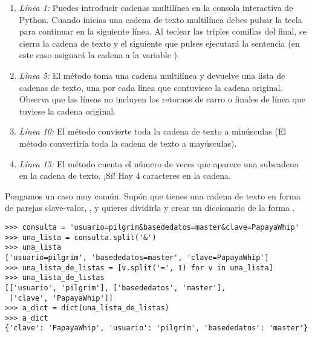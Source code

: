 \begin{enumerate}

\item \emph{Línea 1:} Puedes introducir cadenas multilínea en la consola interactiva de Python. Cuando inicias una cadena de texto multilínea debes pulsar la tecla  para continuar en la siguiente línea. Al teclear las triples comillas del final, se cierra la cadena de texto y el siguiente  que pulses ejecutará la sentencia (en este caso asignará la cadena a la variable ).

\item \emph{Línea 5:} El método  toma una cadena multilínea y devuelve una lista de cadenas de texto, una por cada línea que contuviese la cadena original. Observa que las líneas no incluyen los retornos de carro o finales de línea que tuviese la cadena original.

\item \emph{Línea 10:} El método  convierte toda la cadena de texto a minúsculas (El método  convertiría toda la cadena de texto a mayúsculas).

\item \emph{Línea 15:} El método  cuenta el número de veces que aparece una subcadena en la cadena de texto. ¡Sí! Hay 4 caracteres  en la cadena.

\end{enumerate}

Pongamos un caso muy común. Supón que tienes una cadena de texto en forma de parejas clave-valor, , y quieres dividirla y crear un diccionario de la forma .

\noindent\begin{minipage}{\textwidth}
\begin{lstlisting}[mathescape=True]
>>> consulta = 'usuario=pilgrim&basededatos=master&clave=PapayaWhip'
>>> una_lista = consulta.split('&')
>>> una_lista
['usuario=pilgrim', 'basededatos=master', 'clave=PapayaWhip']
>>> una_lista_de_listas = [v.split('=', 1) for v in una_lista]
>>> una_lista_de_listas
[['usuario', 'pilgrim'], ['basededatos', 'master'],
 ['clave', 'PapayaWhip']]
>>> a_dict = dict(una_lista_de_listas)
>>> a_dict
{'clave': 'PapayaWhip', 'usuario': 'pilgrim', 'basededatos': 'master'}
\end{lstlisting}
\end{minipage}
 
